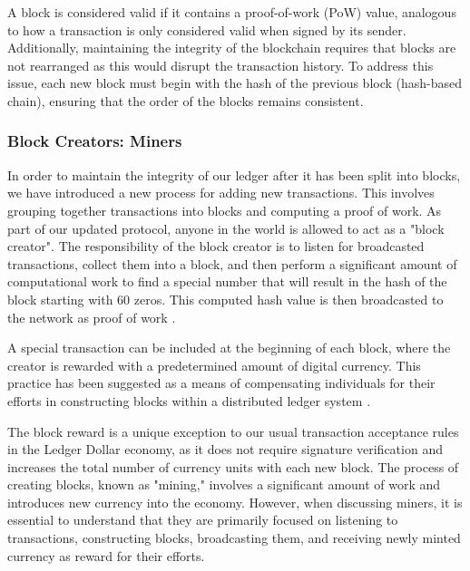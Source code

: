 A block is considered valid if it contains a proof-of-work (PoW) value, analogous to how a transaction is only considered valid when signed by its sender. Additionally, maintaining the integrity of the blockchain requires that blocks are not rearranged as this would disrupt the transaction history. To address this issue, each new block must begin with the hash of the previous block (hash-based chain), ensuring that the order of the blocks remains consistent.

%

\subsubsection{Block Creators: Miners}
In order to maintain the integrity of our ledger after it has been split into blocks, we have introduced a new process for adding new transactions. This involves grouping together transactions into blocks and computing a proof of work. As part of our updated protocol, anyone in the world is allowed to act as a "block creator". The responsibility of the block creator is to listen for broadcasted transactions, collect them into a block, and then perform a significant amount of computational work to find a special number that will result in the hash of the block starting with 60 zeros. This computed hash value is then broadcasted to the network as proof of work \cite{wood2014ethereum}.

A special transaction can be included at the beginning of each block, where the creator is rewarded with a predetermined amount of digital currency. This practice has been suggested as a means of compensating individuals for their efforts in constructing blocks within a distributed ledger system \cite{ding2020incentive}.

%

The block reward is a unique exception to our usual transaction acceptance rules in the Ledger Dollar economy, as it does not require signature verification and increases the total number of currency units with each new block. The process of creating blocks, known as "mining," involves a significant amount of work and introduces new currency into the economy. However, when discussing miners, it is essential to understand that they are primarily focused on listening to transactions, constructing blocks, broadcasting them, and receiving newly minted currency as reward for their efforts.

